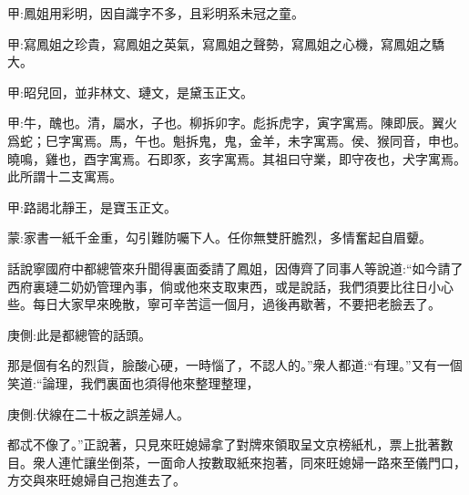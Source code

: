 
\begin{parag}
    \begin{note}甲:鳳姐用彩明，因自識字不多，且彩明系未冠之童。\end{note}
\end{parag}


\begin{parag}
    \begin{note}甲:寫鳳姐之珍貴，寫鳳姐之英氣，寫鳳姐之聲勢，寫鳳姐之心機，寫鳳姐之驕大。\end{note}
\end{parag}


\begin{parag}
    \begin{note}甲:昭兒回，並非林文、璉文，是黛玉正文。\end{note}
\end{parag}


\begin{parag}
    \begin{note}甲:牛，醜也。清，屬水，子也。柳拆卯字。彪拆虎字，寅字寓焉。陳即辰。翼火爲蛇；巳字寓焉。馬，午也。魁拆鬼，鬼，金羊，未字寓焉。侯、猴同音，申也。曉鳴，雞也，酉字寓焉。石即豕，亥字寓焉。其祖曰守業，即守夜也，犬字寓焉。此所謂十二支寓焉。\end{note}
\end{parag}


\begin{parag}
    \begin{note}甲:路謁北靜王，是寶玉正文。\end{note}
\end{parag}


\begin{parag}
    \begin{note}蒙:家書一紙千金重，勾引難防囑下人。任你無雙肝膽烈，多情奮起自眉顰。\end{note}
\end{parag}


\begin{parag}
    話說寧國府中都總管來升聞得裏面委請了鳳姐，因傳齊了同事人等說道:“如今請了西府裏璉二奶奶管理內事，倘或他來支取東西，或是說話，我們須要比往日小心些。每日大家早來晚散，寧可辛苦這一個月，過後再歇著，不要把老臉丟了。\begin{note}庚側:此是都總管的話頭。\end{note}那是個有名的烈貨，臉酸心硬，一時惱了，不認人的。”衆人都道:“有理。”又有一個笑道:“論理，我們裏面也須得他來整理整理，\begin{note}庚側:伏線在二十板之誤差婦人。\end{note}都忒不像了。”正說著，只見來旺媳婦拿了對牌來領取呈文京榜紙札，票上批著數目。衆人連忙讓坐倒茶，一面命人按數取紙來抱著，同來旺媳婦一路來至儀門口，方交與來旺媳婦自己抱進去了。
\end{parag}


